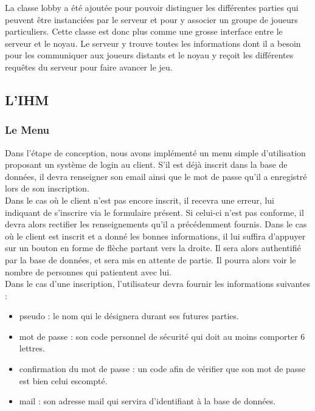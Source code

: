 \documentclass[a4paper,11pt]{article}
\begin{document}
	La classe lobby a été ajoutée pour pouvoir distinguer les différentes parties qui peuvent être instanciées par le serveur et pour y associer un groupe de joueurs particuliers. Cette classe est donc plus comme une grosse interface entre le serveur et le noyau. Le serveur y trouve toutes les informations dont il a besoin pour les communiquer aux joueurs distants et le noyau y reçoit les différentes requêtes du serveur pour faire avancer le jeu.  \\
	


\subsection{L'IHM}


\subsubsection{Le Menu}

	Dans l'étape de conception, nous avons implémenté un menu simple d’utilisation proposant un système de login au client. S’il est déjà inscrit dans la base de données, il devra renseigner son email ainsi que le mot de passe qu’il a enregistré lors de son inscription. \\

    Dans le cas où le client n’est pas encore inscrit, il recevra une erreur, lui indiquant de s’inscrire via le formulaire présent. Si celui-ci n’est pas conforme, il devra alors rectifier les renseignements qu’il a précédemment fournis. Dans le cas où le client est inscrit et a donné les bonnes informations, il lui suffira d’appuyer sur un bouton en forme de flèche partant vers la droite. Il sera alors authentifié par la base de données, et sera mis en attente de partie. Il pourra alors voir le nombre de personnes qui patientent avec lui. \\

	Dans le cas d’une inscription, l’utilisateur devra fournir les informations suivantes :

\begin{itemize}
	\item pseudo : le nom qui le désignera durant ses futures parties.
	\item mot de passe : son code personnel de sécurité qui doit au moins comporter 6 lettres.
	\item confirmation du mot de passe : un code afin de vérifier que son mot de passe est bien celui escompté.
	\item mail : son adresse mail qui servira d’identifiant à la base de données. 	 \\
\end{itemize}
\end{document}
